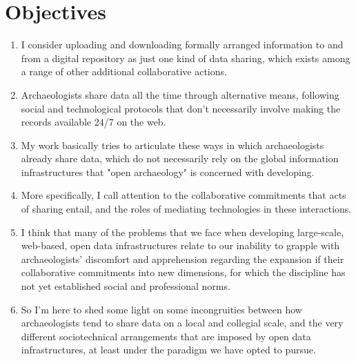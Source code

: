 \documentclass{article}
\begin{document}
\section{Objectives}
\begin{enumerate}
  \item I consider uploading and downloading formally arranged information to and from a digital repository as just one kind of data sharing, which exists among a range of other additional collaborative actions.
  \item Archaeologists share data all the time through alternative means, following social and technological protocols that don't necessarily involve making the records available 24/7 on the web.
  \item My work basically tries to articulate these ways in which archaeologists already share data, which do not necessarily rely on the global information infrastructures that "open archaeology" is concerned with developing.
  \item More specifically, I call attention to the collaborative commitments that acts of sharing entail, and the roles of mediating technologies in these interactions.
  \item I think that many of the problems that we face when developing large-scale, web-based, open data infrastructures relate to our inability to grapple with archaeologists' discomfort and apprehension regarding the expansion if their collaborative commitments into new dimensions, for which the discipline has not yet established social and professional norms.
  \item So I'm here to shed some light on some incongruities between how archaeologists tend to share data on a local and collegial scale, and the very different sociotechnical arrangements that are imposed by open data infrastructures, at least under the paradigm we have opted to pursue.
\end{enumerate}
\end{document}
